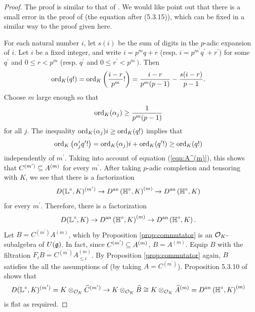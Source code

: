 \documentclass[10pt]{amsart}
\begin{document}
\begin{proof}
The proof is similar to that of \cite[Prop. 5.3.13]{analytic}. We would like point out that there is a small error in the proof of \cite[Prop. 5.3.13]{analytic} (the equation after (5.3.15)), which can be fixed in a similar way to the proof given here. 

For each natural number $i$, let $s(i)$ be the sum of digits in the $p$-adic expansion of $i$. Let $i$ be a fixed integer, and write $i=p^{m}q+r$ (resp. $i=p^{m^\prime}q^\prime +r^\prime$) for some $q^\prime$ and $0\leq r<p^{m}$ (resp. $q^\prime$ and $0\leq r^\prime < p^{m^\prime})$. Then \[
    \textnormal{ord}_{K}(q!)=\textnormal{ord}_{K}\left(\frac{i-r}{p^{m}}!\right)= \frac{i-r}{p^{m}(p-1)}-\frac{s(i-r)}{p-1}.
\]
Choose $m$ large enough so that \[
    \textnormal{ord}_{K}(\alpha_{j})\geq\frac{1}{p^{m}(p-1)}
\] for all $j$. The inequality $\textnormal{ord}_{K}(\alpha_{j})i\geq\textnormal{ord}_{K}(q!)$ implies that \[
    \textnormal{ord}_{K}\left(\alpha_{j}^{i}q^{\prime}!\right)=\textnormal{ord}_{K}(\alpha_{j})i+\textnormal{ord}_{K}(q^{\prime}!)\geq\textnormal{ord}_{K}(q!)
\]
independently of $m^{\prime}$. Taking into account of equation (\ref{eqn:A^(m)}), this shows that $C^{(m^{\prime})}\subseteq A^{(m)}$ for every $m^{\prime}$. After taking $p$-adic completion and tensoring with $K$, we see that there is a factorization \[
    D(\mathbb{L}^{\circ},K)^{(m^{\prime})}\rightarrow D^{\textnormal{an}}\left(\mathbb{H}^{\circ},K\right)^{(m)}\rightarrow D^{\textnormal{an}}\left(\mathbb{H}^{\circ},K\right)
\] for every $m^{\prime}$. Therefore, there is a factorization \[
    D(\mathbb{L}^{\circ},K)\rightarrow D^{\textnormal{an}}\left(\mathbb{H}^{\circ},K\right)^{(m)}\rightarrow D^{\textnormal{an}}\left(\mathbb{H}^{\circ},K\right).
\]
Let $B=C^{(m^{\prime})}A^{(m)}$, which by Proposition \ref{prop:commutator} is an $\mathcal{O}_{K}$-subalgebra of $U(\mathfrak{g})$. In fact, since $C^{(m^{\prime})}\subseteq A^{(m)}$, $B=A^{(m)}$. Equip $B$ with the filtration $F_{i}B=C^{(m^{\prime})}A_{\leq i}^{(m)}$. By Proposition \ref{prop:commutator} again, $B$ satisfies the all the assumptions of \cite[Lem. 5.3.9]{analytic} (by taking $A=C^{(m^{\prime})}$). Proposition 5.3.10 of \cite{analytic} shows that \[
    D(\mathbb{L}^{\circ},K)^{(m^{\prime})}=K\otimes_{\mathcal{O}_{K}}\widehat{C}^{(m^{\prime})}\rightarrow K\otimes_{\mathcal{O}_{K}}\widehat{B}\cong K\otimes_{\mathcal{O}_{K}}\widehat{A}^{(m)}= D^{an}\left(\mathbb{H}^{\circ},K\right)^{(m)}
\] is flat as required.
\end{proof}
\end{document}
